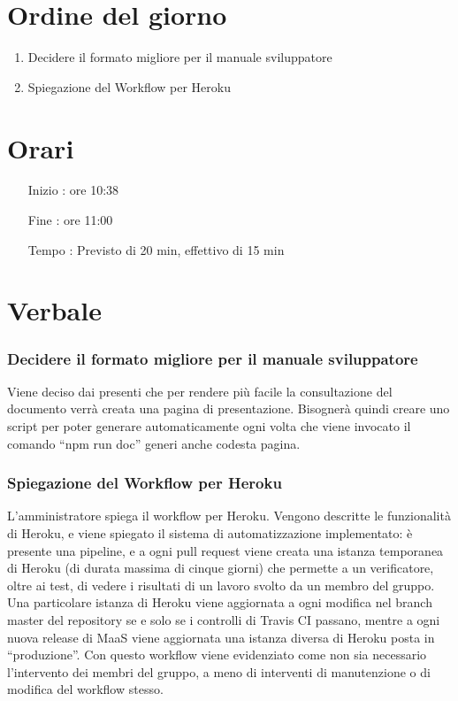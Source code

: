 \documentclass[11pt]{meetingmins}
\begin{document}
\maketitle

\section{Ordine del giorno}

\begin{enumerate}

\item Decidere il formato migliore per il manuale sviluppatore
\item Spiegazione del Workflow per Heroku
\end{enumerate}

\section{Orari}

\begin{itemize}
\item[Inizio]: ore 10:38
\item[Fine]: ore 11:00
\item[Tempo]: Previsto di 20 min, effettivo di 15 min

\end{itemize}

\section{Verbale}

\subsubsection{Decidere il formato migliore per il manuale sviluppatore}
Viene deciso dai presenti che per rendere più facile la consultazione del documento verrà creata una pagina di presentazione. Bisognerà quindi creare uno script per poter generare automaticamente ogni volta che viene invocato il comando ``npm run doc'' generi anche codesta pagina.

\subsubsection{Spiegazione del Workflow per Heroku}
L'amministratore spiega il workflow per Heroku. Vengono descritte le funzionalità di Heroku, e viene spiegato il sistema di automatizzazione implementato: è presente una pipeline, e a ogni pull request viene creata una istanza temporanea di Heroku (di durata massima di cinque giorni) che permette a un verificatore, oltre ai test, di vedere i risultati di un lavoro svolto da un membro del gruppo.
Una particolare istanza di Heroku viene aggiornata a ogni modifica nel branch master del repository se e solo se i controlli di Travis CI passano, mentre a ogni nuova release di MaaS viene aggiornata una istanza diversa di Heroku posta in ``produzione''.
Con questo workflow viene evidenziato come non sia necessario l'intervento dei membri del gruppo, a meno di interventi di manutenzione o di modifica del workflow stesso.

\end{document}
